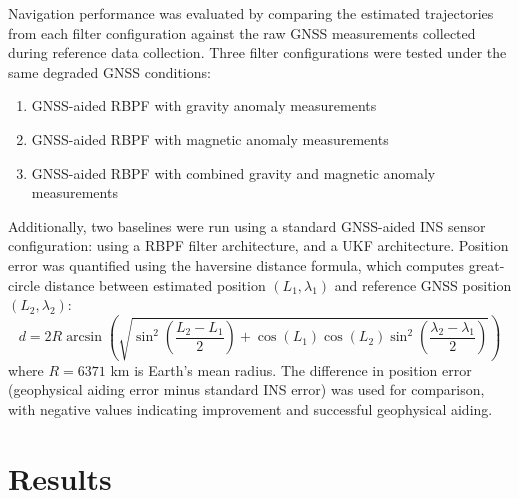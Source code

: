 \documentclass[letterpaper,times]{IONconf}
\begin{document}
Navigation performance was evaluated by comparing the estimated trajectories from each filter configuration against the raw GNSS measurements collected during reference data collection. Three filter configurations were tested under the same degraded GNSS conditions:
\begin{enumerate}
    \item GNSS-aided RBPF with gravity anomaly measurements
    \item GNSS-aided RBPF with magnetic anomaly measurements
    \item GNSS-aided RBPF with combined gravity and magnetic anomaly measurements
\end{enumerate}
Additionally, two baselines were run using a standard GNSS-aided INS sensor configuration: using a RBPF filter architecture, and a UKF architecture. Position error was quantified using the haversine distance formula, which computes great-circle distance between estimated position \((L_1, \lambda_1)\) and reference GNSS position \((L_2, \lambda_2)\):
\begin{equation}
d = 2R \arcsin\left(\sqrt{\sin^2\left(\frac{L_2 - L_1}{2}\right) + \cos(L_1)\cos(L_2)\sin^2\left(\frac{\lambda_2 - \lambda_1}{2}\right)}\right)
\end{equation}
where \(R = 6371\) km is Earth's mean radius. The difference in position error (geophysical aiding error minus standard INS error) was used for comparison, with negative values indicating improvement and successful geophysical aiding.

\section{Results}
\end{document}
